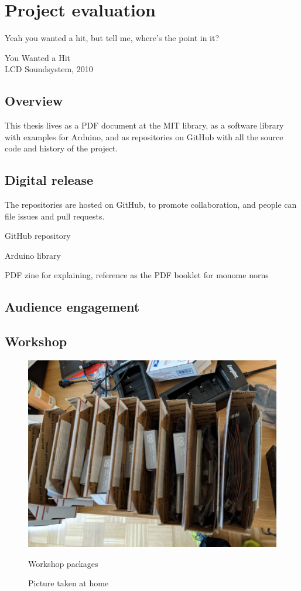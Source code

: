 \chapter{Project evaluation}

\epigraph{Yeah you wanted a hit, but tell me, where's the point in it?}{You Wanted a Hit \\ LCD Soundsystem, 2010}

\section{Overview}

This thesis lives as a PDF document at the MIT library, as a software library with examples for Arduino, and as repositories on GitHub with all the source code and history of the project.

\section{Digital release}

The repositories are hosted on GitHub, to promote collaboration, and people can file issues and pull requests.

GitHub repository

Arduino library

PDF zine for explaining, reference as the PDF booklet for monome norns

\section{Audience engagement}


\section{Workshop}

\begin{figure}[h]
	\centering
	  \includegraphics[width=0.75\linewidth,height=0.25\textheight,keepaspectratio]{images/workshop-packages.jpg}
	\caption{Workshop packages}
	\caption*{Picture taken at home}
	\label{fig:workshop-packages}
      \end{figure}

